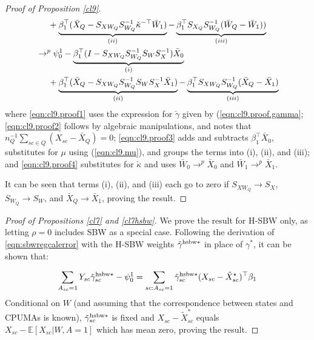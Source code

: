 \begin{proof}[Proof of Proposition \ref{cl9}]
\begin{align}
    \nonumber & \hskip.5cm {} + \underbrace{\beta_1^\top (\bar{X}_Q - S_{XW_Q} S_{W_Q}^{-1} \check{\kappa}^{-\top}\bar{W}_1)}_{(ii)} - \underbrace{\beta_1^\top S_{X_Q}S_{W_Q}^{-1}(\bar{W}_Q - \bar{W}_1))}_{(iii)}\\
\label{eqn:cl9.proof4}    & \to^p \psi_0^1 - \underbrace{\beta_1^\top (I - S_{XW_Q}S_{W_Q}^{-1}S_WS_X^{-1})\bar{X}_0}_{(i)} \\
    \nonumber & \hskip.5cm {} + \underbrace{\beta_1^\top (\bar{X}_Q - S_{XW_Q}S_{W_Q}^{-1} S_W S_X^{-1} \bar{X}_1)}_{(ii)} - \underbrace{\beta_1^\top S_{XW_Q}S_{W_Q}^{-1}(\bar{X}_Q - \bar{X}_1)}_{(iii)}
\end{align}
where \eqref{eqn:cl9.proof1} uses the expression for $\check{\gamma}$ given by (\ref{eqn:cl9.proof.gamma}; \eqref{eqn:cl9.proof2} follows by algebraic manipulations, and notes that $n_Q^{-1}\sum_{sc \in Q} (X_{sc} - \bar{X}_Q) = 0$; \eqref{eqn:cl9.proof3} adds and subtracts $\beta_1^\top \bar{X}_0$,  substitutes for $\mu$ using (\ref{eqn:cl9.mu}), and groups the terms into (i), (ii), and (iii); and \eqref{eqn:cl9.proof4} substitutes for $\check{\kappa}$ and uses $\bar{W}_0 \to^p \bar{X}_0$ and $\bar{W}_1 \to^p \bar{X}_1$.

It can be seen that terms (i), (ii), and (iii) each go to zero if $S_{XW_Q} \to S_X$, $S_{W_Q} \to S_W$, and $\bar{X}_Q \to \bar{X}_1$, proving the result. 
\end{proof}

\begin{proof}[Proof of Propositions \ref{cl7} and \ref{cl7hsbw}]
    We prove the result for H-SBW only, as letting $\rho=0$ includes SBW as a special case. Following the derivation of \eqref{eqn:sbwregcalerror} with the H-SBW weights $\tilde{\gamma}^{\textup{hsbw}*}$ in place of $\gamma^*$, it can be shown that: 
    
    \begin{align*}
        \sum_{A_{sc}=1} Y_{sc} \tilde{\gamma}_{sc}^{\textup{hsbw}*} - \psi^1_0 = \sum_{sc: A_{sc} = 1}\tilde{\gamma}^{\textup{hsbw}*}_{sc}(X_{sc} - \tilde{X}_{sc}^\star)^\top \beta_1
    \end{align*}
Conditional on $W$ (and assuming that the correspondence between states and CPUMAs is known), $\tilde{\gamma}_{sc}^{\textup{hsbw}*}$ is fixed and $X_{sc} - \tilde{X}_{sc}^*$ equals $X_{sc} - \mathbb{E}[X_{sc}|W, A=1]$ which has mean zero, proving the result.
\end{proof}

